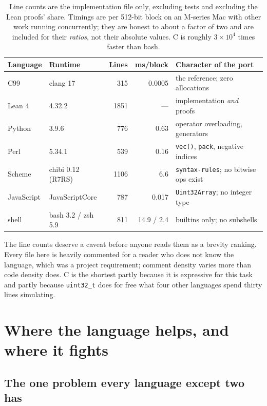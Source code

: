 \documentclass[11pt,a4paper]{article}
\newcommand{\code}[1]{\texttt{#1}}
\begin{document}
\begin{table}[h]
\centering
\small
\begin{tabular}{@{}llrrl@{}}
\toprule
\textbf{Language} & \textbf{Runtime} & \textbf{Lines} & \textbf{ms/block} & \textbf{Character of the port} \\
\midrule
C99        & clang 17           &  315 & 0.0005 & the reference; zero allocations \\
Lean 4     & 4.32.2             & 1851 & ---    & implementation \emph{and} proofs \\
Python     & 3.9.6              &  776 & 0.63   & operator overloading, generators \\
Perl       & 5.34.1             &  539 & 0.16   & \code{vec()}, \code{pack}, negative indices \\
Scheme     & chibi 0.12 (R7RS)  & 1106 & 6.6    & \code{syntax-rules}; no bitwise ops exist \\
JavaScript & JavaScriptCore     &  787 & 0.017  & \code{Uint32Array}; no integer type \\
shell      & bash 3.2 / zsh 5.9 &  811 & 14.9 / 2.4 & builtins only; no subshells \\
\bottomrule
\end{tabular}
\caption{Line counts are the implementation file only, excluding tests and
excluding the Lean proofs' share. Timings are per 512-bit block on an
M-series Mac with other work running concurrently; they are honest to about a
factor of two and are included for their \emph{ratios}, not their absolute
values. C is roughly \(3\times10^{4}\) times faster than bash.}
\label{tab:glance}
\end{table}

The line counts deserve a caveat before anyone reads them as a brevity
ranking. Every file here is heavily commented for a reader who does not know
the language, which was a project requirement; comment density varies more
than code density does. C is the shortest partly because it is expressive for
this task and partly because \code{uint32\_t} does for free what four other
languages spend thirty lines simulating.

\section{Where the language helps, and where it fights}
\label{sec:perlang}

\subsection{The one problem every language except two has}
\end{document}
